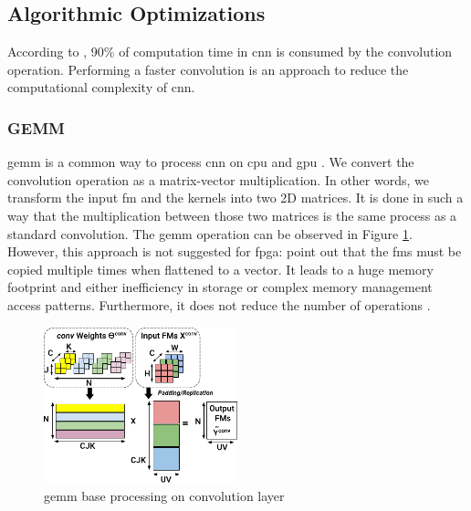 \subsection{Algorithmic Optimizations} \label{subsec:algopti}
According to \textcite{shawahna_fpga-based_2019}, 90\% of computation time in \acrshort{cnn} is consumed by the convolution operation. Performing a faster convolution is an approach to reduce the computational complexity of \acrshort{cnn}.
%
%
\subsubsection{GEMM}
%
%
\acrfull{gemm} is a common way to process \acrshort{cnn} on \acrshort{cpu} and \acrshort{gpu} \cite{abdelouahab_accelerating_2018}. We convert the convolution operation as a matrix-vector multiplication. In other words, we transform the input \acrshort{fm} and the kernels into two 2D matrices. It is done in such a way that the multiplication between those two matrices is the same process as a standard convolution. The \acrshort{gemm} operation can be observed in Figure \ref{fig:gemm}. However, this approach is not suggested for \acrshort{fpga}: \textcite{sze_efficient_2017, zhu_efficient_2020} point out that the \acrshort{fm}s must be copied multiple times when flattened to a vector. It leads to a huge memory footprint and either inefficiency in storage or complex memory management access patterns. Furthermore, it does not reduce the number of operations \cite{liang_evaluating_2020}.
%
\begin{figure}
    \centering
    \includegraphics[width=0.5\textwidth]{Images/gemm.pdf}
    \caption{\acrshort{gemm} base processing on convolution layer \cite{abdelouahab_accelerating_2018}}
    \label{fig:gemm}
\end{figure}
%
%
